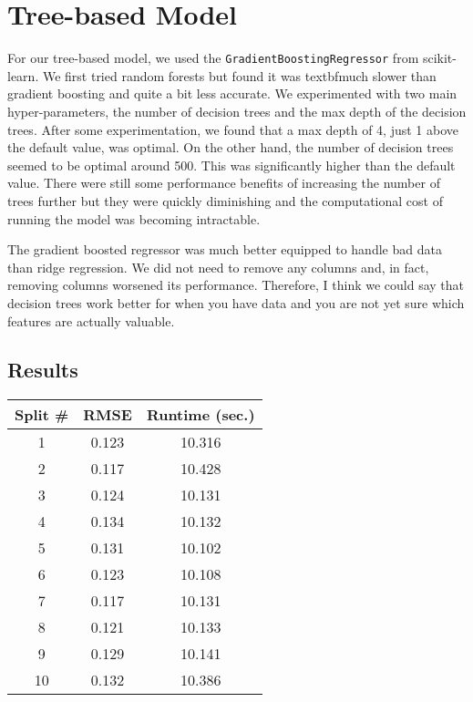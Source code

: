 \documentclass{article}
\begin{document}
\section{Tree-based Model}

For our tree-based model, we used the \verb.GradientBoostingRegressor. from scikit-learn. We first tried random forests but found it was textbf{much} slower than gradient boosting and quite a bit less accurate. We experimented with two main hyper-parameters, the number of decision trees and the max depth of the decision trees. After some experimentation, we found that a max depth of 4, just 1 above the default value, was optimal. On the other hand, the number of decision trees seemed to be optimal around 500. This was significantly higher than the default value. There were still some performance benefits of increasing the number of trees further but they were quickly diminishing and the computational cost of running the model was becoming intractable.

The gradient boosted regressor was much better equipped to handle bad data than ridge 
regression. We did not need to remove any columns and, in fact, removing columns worsened
its performance. Therefore, I think we could say that decision trees work better for 
when you have data and you are not yet sure which features are actually valuable. 



\subsection{Results}


\begin{center} 
    \begin{tabular}{ | c |  c |  c |} 
        \hline
        Split \# & RMSE & Runtime (sec.) \\ 
        \hline\hline
        1 & 0.123 & 10.316 \\ 
        \hline 
        2 & 0.117 & 10.428 \\ 
        \hline 
        3 & 0.124 & 10.131 \\ 
        \hline 
        4 & 0.134 & 10.132\\ 
        \hline 
        5 & 0.131 & 10.102 \\ 
        \hline 
        6 & 0.123 & 10.108 \\ 
        \hline
         7 & 0.117 & 10.131 \\ 
         \hline 
        8 & 0.121 & 10.133 \\ 
        \hline 
        9 & 0.129 & 10.141 \\ 
        \hline
        10 & 0.132 & 10.386 \\ 
        \hline 
    \end{tabular} 
\end{center}
\end{document}
